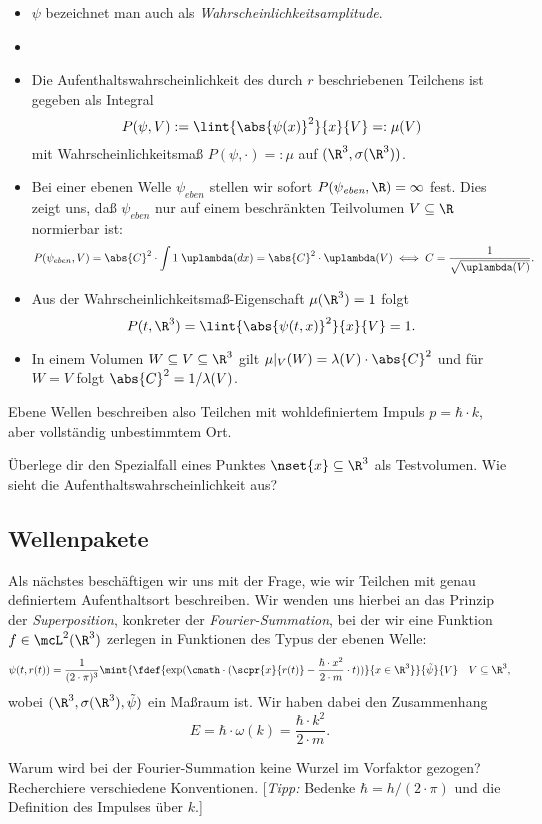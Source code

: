 \documentclass{article}
\begin{document}
        \begin{itemize}[label=$\to$]
            \item $\psi$ bezeichnet man auch als \emph{Wahrscheinlichkeitsamplitude}. 
            \item 
            \item Die Aufenthaltswahrscheinlichkeit des durch $r$ beschriebenen Teilchens ist gegeben als Integral 
            \[P(\psi,V) := \lint{\abs{\psi(x)}^2}{x}{V} =: \mu(V)\]
            mit Wahrscheinlichkeitsmaß $P(\psi,\cdot)=:\mu$ auf $(\R^3,\sigma(\R^3))$. 
            \item Bei einer ebenen Welle $\psi_\textit{eben}$ stellen wir sofort $P(\psi_\textit{eben},\R) = \infty$ fest. Dies zeigt uns, daß $\psi_\textit{eben}$ nur auf einem beschränkten Teilvolumen $V\subseteq\R$ normierbar ist:
            \[
                P(\psi_{eben},V) = \abs{C}^2\cdot\int 1\;\uplambda(dx) = \abs{C}^2\cdot\uplambda(V) \iff C = \frac{1}{\sqrt{\uplambda(V)}}. 
            \]
            \item Aus der Wahrscheinlichkeitsmaß-Eigenschaft $\mu(\R^3) = 1$ folgt
            \[P(t,\R^3) = \lint{\abs{\psi(t,x)}^2}{x}{V} = 1.\]
            \item In einem Volumen $W\subseteq V\subseteq\R^3$ gilt $\mu|_V(W) = \lambda(V)\cdot\abs{C}^2$ und für $W=V$ folgt $\abs{C}^2 = 1/\lambda(V)$.
        \end{itemize}
        Ebene Wellen beschreiben also Teilchen mit wohldefiniertem Impuls $p = \hbar\cdot k$, aber vollständig unbestimmtem Ort.
        \begin{Aufgabe}
            \nr{} Überlege dir den Spezialfall eines Punktes $\nset{x}\subseteq\R^3$ als Testvolumen. Wie sieht die Aufenthaltswahrscheinlichkeit aus?
        \end{Aufgabe}

    \subsection*{Wellenpakete}
        Als nächstes beschäftigen wir uns mit der Frage, wie wir Teilchen mit genau definiertem Aufenthaltsort beschreiben. Wir wenden uns hierbei an das Prinzip der \emph{Superposition}, konkreter der \emph{Fourier-Summation}, bei der wir eine Funktion $f\in \mcL^2(\R^3)$ zerlegen in Funktionen des Typus der ebenen Welle:
        \[\psi(t,r(t)) = \frac{1}{(2\cdot\pi)^3}\mint{\fdef{\exp(\cmath\cdot(\scpr{x}{r(t)} - \frac{\hbar\cdot x^2}{2\cdot m}\cdot t))}{x\in\R^3}}{\tilde\psi}{V}\quad V\subseteq\R^3,\]
        wobei $(\R^3,\sigma(\R^3),\tilde\psi)$ ein Maßraum ist. Wir haben dabei den Zusammenhang 
        \[E = \hbar\cdot\omega(k) = \frac{\hbar\cdot k^2}{2\cdot m}.\]

        \begin{Aufgabe}
            \nr{} Warum wird bei der Fourier-Summation keine Wurzel im Vorfaktor gezogen? Recherchiere verschiedene Konventionen. [\textit{Tipp:} Bedenke $\hbar = h/(2\cdot \pi)$ und die Definition des Impulses über $k$.]
        \end{Aufgabe}
\end{document}

